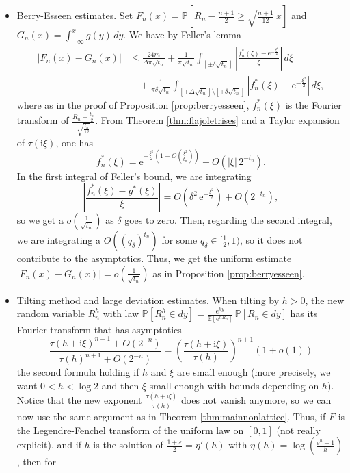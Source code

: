 \documentclass[12pt,a4paper,reqno]{amsart}
\theoremstyle{remark}
\newcommand{\E}{\mathrm{e}}
\newcommand{\I}{\mathrm{i}}
\newcommand{\esper}{\mathbb{E}}
\newcommand{\proba}{\mathbb{P}}
\newcommand{\eps}{\varepsilon}
\begin{document}
\begin{itemize}
    \item Berry-Esseen estimates. Set $F_n(x) = \proba[R_n - \frac{n+1}{2}\geq \sqrt{\frac{n+1}{12}}\,x]$ and $G_n(x)=\int_{-\infty}^x g(y)\,dy$. We have by Feller's lemma
    \begin{align*}
    |F_n(x)-G_n(x)| &\leq \frac{24m}{\Delta\pi\sqrt{t_n}} + \frac{1}{\pi\sqrt{t_n}} \int_{[\pm\delta \sqrt{t_n}]} \left|\frac{f_n^*(\xi)-\E^{-\frac{\xi^2}{2}}}{\xi}\right|\,d\xi  \\
    &\quad+ \frac{1}{\pi\delta\sqrt{t_n}} \int_{[\pm \Delta \sqrt{t_n}]\setminus [\pm \delta \sqrt{t_n}]} \left|f_n^*(\xi)-\E^{-\frac{\xi^2}{2}}\right|\,d\xi,
    \end{align*}
    where as in the proof of Proposition \ref{prop:berryesseen}, $f_n^*(\xi)$ is the Fourier transform of $\frac{R_n-\frac{t_n}{2}}{\sqrt{\frac{t_n}{12}}}$.
    From Theorem \ref{thm:flajoletrises} and a Taylor expansion of $\tau(\I \xi)$, one has 
    $$f_n^*(\xi) = \E^{-\frac{\xi^2}{2}\left(1+O\!\left(\frac{\xi^2}{t_n}\right)\right)} + O(|\xi|\,2^{-t_n}).$$
    In the first integral of Feller's bound, we are integrating 
    $$\left|\frac{f_n^*(\xi)-g^*(\xi)}{\xi}\right| = O\left(\delta^2\,\E^{-\frac{\xi^2}{2}}\right)+O(2^{-t_n}),$$
    so we get a $o(\frac{1}{\sqrt{t_n}})$ as $\delta$ goes to zero. Then, regarding the second integral, we are integrating a $O((q_\delta)^{t_n})$ for some $q_\delta\in [\frac{1}{2},1)$, so it does not contribute to the asymptotics. Thus, we get the uniform estimate $|F_n(x)-G_n(x)|=o(\frac{1}{\sqrt{t_n}})$ as in Proposition \ref{prop:berryesseen}.\vspace{2mm}
    \item Tilting method and large deviation estimates. When tilting by $h > 0$, the new random variable $R_n^h$ with law $\proba[R_n^h \in dy]=\frac{\E^{hy}}{\esper[\E^{hR_n}]}\,\proba[R_n \in dy]$ has its Fourier transform that has asymptotics
    $$\frac{\tau(h+\I\xi)^{n+1}+O(2^{-n})}{\tau(h)^{n+1}+O(2^{-n})} = \left(\frac{\tau(h+\I \xi)}{\tau(h)}\right)^{n+1} (1+o(1))$$ 
    the second formula holding if $h$ and $\xi$ are small enough (more precisely, we want $0<h<\log 2$ and then $\xi$ small enough with bounds depending on $h$).
    Notice that the new exponent $\frac{\tau(h+\I \xi)}{\tau(h)}$ does not vanish anymore, so we can now use the same argument as in Theorem \ref{thm:mainnonlattice}. Thus, if $F$ is the Legendre-Fenchel transform of the uniform law on $[0,1]$ (not really explicit), and if $h$ is the solution of $\frac{1+\eps}{2}=\eta'(h)$ with $\eta(h) = \log\left(\frac{\E^h-1}{h}\right)$, then for 

\end{itemize}
\end{document}
